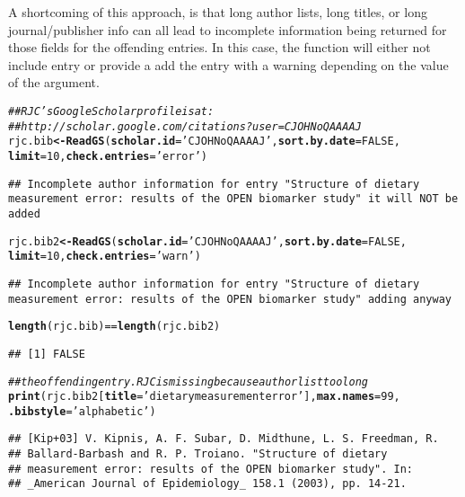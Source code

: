 \documentclass[article]{jss}\usepackage[]{graphicx}\usepackage[]{color}
\makeatletter
\newcommand{\hlnum}[1]{\textcolor[rgb]{0.125,0.125,1}{#1}}%
\newcommand{\hlstr}[1]{\textcolor[rgb]{0.125,0.125,1}{#1}}%
\newcommand{\hlcom}[1]{\textcolor[rgb]{1,0,0.753}{\textit{#1}}}%
\newcommand{\hlopt}[1]{\textcolor[rgb]{0.251,0.251,0.282}{#1}}%
\newcommand{\hlstd}[1]{\textcolor[rgb]{0.251,0.251,0.282}{#1}}%
\newcommand{\hlkwb}[1]{\textcolor[rgb]{0.439,0.251,1}{\textbf{#1}}}%
\newcommand{\hlkwc}[1]{\textcolor[rgb]{0.529,0,0.184}{\textbf{#1}}}%
\newcommand{\hlkwd}[1]{\textcolor[rgb]{0.251,0.251,0.282}{\textbf{#1}}}%
\newenvironment{kframe}{%
 \def\at@end@of@kframe{}%
 \ifinner\ifhmode%
  \def\at@end@of@kframe{\end{minipage}}%
  \begin{minipage}{\columnwidth}%
 \fi\fi%
 \def\FrameCommand##1{\hskip\@totalleftmargin \hskip-\fboxsep
 \colorbox{shadecolor}{##1}\hskip-\fboxsep
     \hskip-\linewidth \hskip-\@totalleftmargin \hskip\columnwidth}%
 \MakeFramed {\advance\hsize-\width
   \@totalleftmargin\z@ \linewidth\hsize
   \@setminipage}}%
 {\par\unskip\endMakeFramed%
 \at@end@of@kframe}
\newenvironment{knitrout}{}{} %
\makeatother
\begin{document}
A shortcoming of this approach, is that long author lists, long titles, or long journal/publisher info can all lead to incomplete information being returned for those fields for the offending entries.  In this case, the  function will either not include entry or provide a add the entry with a warning depending on the value of the  argument.
\begin{knitrout}
\color{fgcolor}\begin{kframe}
\begin{alltt}
\hlcom{## RJC's Google Scholar profile is at: }
\hlcom{## http://scholar.google.com/citations?user=CJOHNoQAAAAJ}
\hlstd{rjc.bib} \hlkwb{<-} \hlkwd{ReadGS}\hlstd{(}\hlkwc{scholar.id} \hlstd{=} \hlstr{'CJOHNoQAAAAJ'}\hlstd{,} \hlkwc{sort.by.date} \hlstd{=} \hlnum{FALSE}\hlstd{,}
                  \hlkwc{limit} \hlstd{=} \hlnum{10}\hlstd{,} \hlkwc{check.entries} \hlstd{=} \hlstr{'error'}\hlstd{)}
\end{alltt}
\begin{lstlisting}
## Incomplete author information for entry "Structure of dietary measurement error: results of the OPEN biomarker study" it will NOT be added
\end{lstlisting}\begin{alltt}
\hlstd{rjc.bib2} \hlkwb{<-} \hlkwd{ReadGS}\hlstd{(}\hlkwc{scholar.id} \hlstd{=} \hlstr{'CJOHNoQAAAAJ'}\hlstd{,} \hlkwc{sort.by.date} \hlstd{=} \hlnum{FALSE}\hlstd{,}
                  \hlkwc{limit} \hlstd{=} \hlnum{10}\hlstd{,} \hlkwc{check.entries} \hlstd{=} \hlstr{'warn'}\hlstd{)}
\end{alltt}
\begin{lstlisting}
## Incomplete author information for entry "Structure of dietary measurement error: results of the OPEN biomarker study" adding anyway
\end{lstlisting}\begin{alltt}
\hlkwd{length}\hlstd{(rjc.bib)} \hlopt{==} \hlkwd{length}\hlstd{(rjc.bib2)}
\end{alltt}
\begin{verbatim}
## [1] FALSE
\end{verbatim}
\begin{alltt}
\hlcom{## the offending entry.  RJC is missing because author list too long}
\hlkwd{print}\hlstd{(rjc.bib2[}\hlkwc{title}\hlstd{=}\hlstr{'dietary measurement error'}\hlstd{],} \hlkwc{max.names} \hlstd{=} \hlnum{99}\hlstd{,}
      \hlkwc{.bibstyle} \hlstd{=} \hlstr{'alphabetic'}\hlstd{)}
\end{alltt}
\begin{verbatim}
## [Kip+03] V. Kipnis, A. F. Subar, D. Midthune, L. S. Freedman, R.
## Ballard-Barbash and R. P. Troiano. "Structure of dietary
## measurement error: results of the OPEN biomarker study". In:
## _American Journal of Epidemiology_ 158.1 (2003), pp. 14-21.
\end{verbatim}
\end{kframe}
\end{knitrout}
\end{document}
